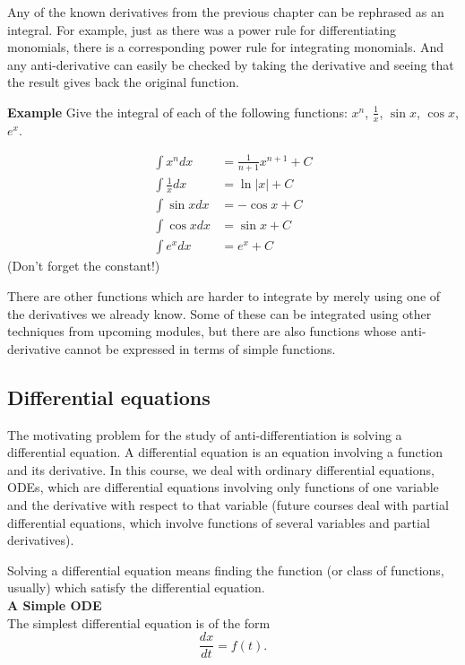 \documentclass[twoside,openright,titlepage,a4paper]{book}
\begin{document}
\begin{sloppypar}
Any of the known derivatives from the previous chapter can be rephrased as an integral. For example, just as there was a power rule for differentiating monomials, there is a corresponding power rule for integrating monomials. And any anti-derivative can easily be checked by taking the derivative and seeing that the result gives back the original function.

\textbf{Example} Give the integral of each of the following functions: $x^n$, $\frac{1}{x}$, $\sin x$, $\cos x$, $e^x$.
\begin{examplebox}
\begin{align*}
\int x^n dx &= \frac{1}{n+1}x^{n+1} + C \\
\int \frac{1}{x} dx &= \ln |x| + C \\
\int \sin x dx &= - \cos x + C \\
\int \cos x dx &= \sin x + C \\
\int e^x dx &= e^x + C 
\end{align*}
(Don't forget the constant!)	
\end{examplebox}	

There are other functions which are harder to integrate by merely using one of the derivatives we already know. Some of these can be integrated using other techniques from upcoming modules, but there are also functions whose anti-derivative cannot be expressed in terms of simple functions.

\subsection{Differential equations}

The motivating problem for the study of anti-differentiation is solving a differential equation. A differential equation is an equation involving a function and its derivative. In this course, we deal with ordinary differential equations, ODEs, which are differential equations involving only functions of one variable and the derivative with respect to that variable (future courses deal with partial differential equations, which involve functions of several variables and partial derivatives).

Solving a differential equation means finding the function (or class of functions, usually) which satisfy the differential equation.\\

\textbf{A Simple ODE}\\

The simplest differential equation is of the form \[ \frac{dx}{dt} = f(t). \]


\end{sloppypar}
\end{document}
